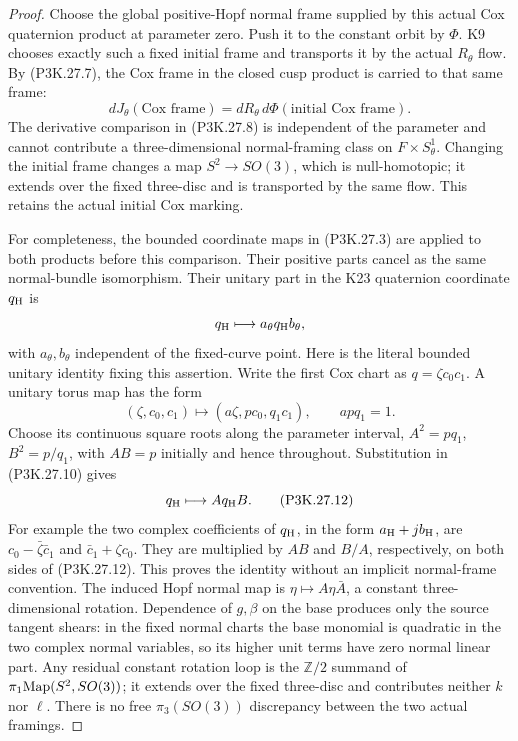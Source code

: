 \begin{proof}
Choose the global positive-Hopf normal frame supplied by
this actual Cox quaternion product at parameter zero.
Push it to the constant orbit by \(\Phi\). K9 chooses
exactly such a fixed initial frame and transports it by
the actual \(R_\theta\) flow. By (P3K.27.7), the Cox
frame in the closed cusp product is carried to that same
frame:
\[
        dJ_\theta(\text{Cox frame})
           =dR_\theta\,d\Phi(\text{initial Cox frame}).
                                                        \tag{P3K.27.9}
\]
The derivative comparison in (P3K.27.8) is independent
of the parameter and cannot contribute a three-dimensional
normal-framing class on \(F\times S^1_\theta\).
Changing the initial frame changes a map
\(S^2\to SO(3)\), which is null-homotopic; it extends
over the fixed three-disc and is transported by the same
flow. This retains the actual initial Cox marking.

For completeness, the bounded coordinate maps in
(P3K.27.3) are applied to both products before this
comparison. Their positive parts cancel as the same
normal-bundle isomorphism. Their unitary part in the
K23 quaternion coordinate \(q_{\rm H}\) is
\[
                   q_{\rm H}\longmapsto
                         a_\theta q_{\rm H}b_\theta,
\]
with \(a_\theta,b_\theta\) independent of the fixed-curve
point. Here is the literal bounded unitary identity fixing
this assertion. Write the first Cox chart as
\(q=\zeta c_0c_1\). A unitary torus map has the form
\[
  (\zeta,c_0,c_1)\longmapsto
                  (a\zeta,p c_0,q_1c_1),\qquad apq_1=1.
\]
Choose its continuous square roots along the parameter interval,
\(A^2=pq_1\), \(B^2=p/q_1\), with \(AB=p\) initially
and hence throughout. Substitution in (P3K.27.10) gives
\[
                      q_{\rm H}\longmapsto A q_{\rm H}B.
                                                        \tag{P3K.27.12}
\]
For example the two complex coefficients of \(q_{\rm H}\),
in the form \(a_{\rm H}+jb_{\rm H}\), are
\(c_0-\bar\zeta\bar c_1\) and
\(\bar c_1+\zeta c_0\). They are multiplied by \(AB\)
and \(B/A\), respectively, on both sides of
(P3K.27.12). This proves the identity without an implicit
normal-frame convention. The induced Hopf normal map is
\(\eta\mapsto A\eta\bar A\), a constant
three-dimensional rotation. Dependence of \(g,\beta\)
on the base produces only the source tangent shears:
in the fixed normal charts the base monomial is
quadratic in the two complex normal variables, so its
higher unit terms have zero normal linear part.
Any residual constant rotation loop is the
\(\mathbb Z/2\) summand of
\(\pi_1{\rm Map}(S^2,SO(3))\); it extends over the fixed
three-disc and contributes neither \(k\) nor \(\ell\).
There is no free \(\pi_3(SO(3))\) discrepancy between
the two actual framings.


\end{proof}
